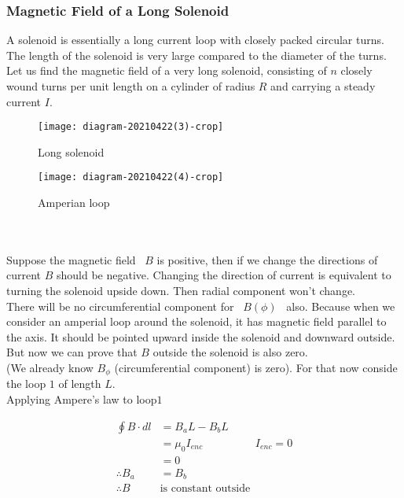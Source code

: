\subsubsection{Magnetic Field of a Long  Solenoid}
A solenoid is essentially a long current loop with closely packed circular turns. The length of the solenoid  is very large compared to  the diameter of the turns. 
Let us find the magnetic field of a very long solenoid, consisting of $n$ closely wound turns per unit length on a cylinder of radius $R$ and carrying a steady current $I$.

\begin{minipage}{.45\textwidth}
\begin{figure}[H]
		\begin{center}
		\texttt{[image: diagram-20210422(3)-crop]}
	\end{center}
\label{key}
\caption{Long solenoid}
	\end{figure}

\end{minipage}
\begin{minipage}{.45\textwidth}
	\begin{figure}[H]
		\begin{center}
			\texttt{[image: diagram-20210422(4)-crop]}
		\end{center}
	\label{key}
	\caption{Amperian loop}
	\end{figure}
\end{minipage}
\\\\Suppose the magnetic field \ $B$ is positive, then if we change the directions of current $B$ should be negative. Changing the direction of current is equivalent to turning the solenoid upside down. Then radial component won't change.\\
There will be no circumferential component for \ $B(\phi)$ \ also. Because when we consider an amperial loop around the solenoid, it has magnetic field parallel to the axis. It should be pointed upward inside the solenoid and downward outside. But now we can prove that $B$ outside the solenoid is also zero.\\
(We already know $B_\phi$ (circumferential component) is zero). For that now conside the loop $1$ of length $L$.\\
Applying Ampere's law to loop$1$\\
\begin{minipage}{0.65\textwidth}
	\begin{align*}
	\oint B\cdot dl&=B_a L-B_b L\\
	&=\mu_0 I_{enc} \hspace{2cm}I_{enc}=0\\
	&=0\\
	\therefore B_a&=B_b\\
	\therefore B\ &\text{is constant outside}
	\end{align*} 
\end{minipage}
